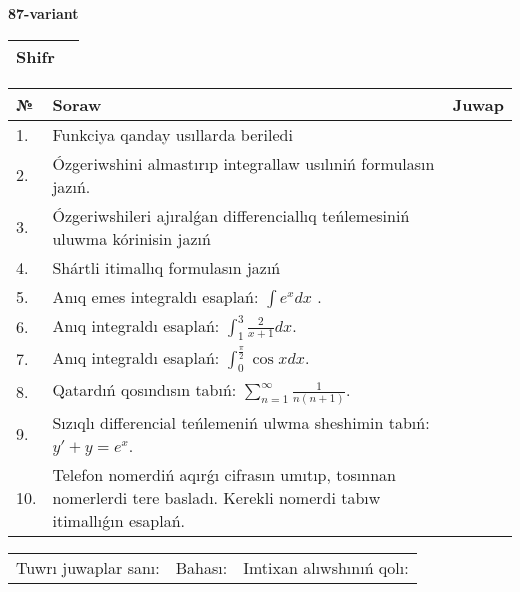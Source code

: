 \documentclass{article}
\begin{document}
  \egroup
  
  \newpage
  
  
  \textbf{87-variant}\\
  
  \bgroup
  \def\arraystretch{1.6} %
  
  \begin{tabular}{|m{5.7cm}|m{9.5cm}|}
  \hline
  Shifr & \\
  \hline
  \end{tabular}
  
  \vspace{1cm}
  
  \begin{tabular}{|m{0.7cm}|m{10cm}|m{4cm}|}
  \hline
  № & Soraw & Juwap \\
  \hline
  1. & Funkciya qanday usıllarda beriledi &  \\
  \hline
  2. & Ózgeriwshini almastırıp integrallaw usılıniń formulasın jazıń. &  \\
  \hline
  3. & Ózgeriwshileri ajıralǵan differenciallıq teńlemesiniń uluwma kórinisin jazıń &  \\
  \hline
  4. & Shártli itimallıq formulasın jazıń &  \\
  \hline
  5. & Anıq emes integraldı esaplań: \(\int{e^{x}dx}\) . &  \\
  \hline
  6. & Anıq integraldı esaplań: \(\int_{1}^{3}\frac{2}{x + 1}dx\). &  \\
  \hline
  7. & Anıq integraldı esaplań: \(\int_{0}^{\frac{\pi}{2}}{\cos xdx}\). &  \\
  \hline
  8. & Qatardıń qosındısın tabıń: \(\sum_{n = 1}^{\infty}\frac{1}{n(n + 1)}\). &  \\
  \hline
  9. & Sızıqlı differencial teńlemeniń ulwma sheshimin tabıń: \(y' + y = e^{x}\). &  \\
  \hline
  10. & Telefon nomerdiń aqırǵı cifrasın umıtıp, tosınnan nomerlerdi tere basladı. Kerekli nomerdi tabıw itimallıǵın esaplań. &  \\
  \hline
  \end{tabular}
  
  \vspace{1cm}
  
  \begin{tabular}{lll}
  Tuwrı juwaplar sanı: \underline{\hspace{1.5cm}} & 
  Bahası: \underline{\hspace{1.5cm}} & 
  Imtixan alıwshınıń qolı: \underline{\hspace{2cm}} \\
  \end{tabular}
  
\end{document}
